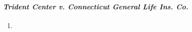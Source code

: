 \paragraph{\emph{Trident Center v. Connecticut General Life Ins. Co.}}

\begin{enumerate}
    \item %
\end{enumerate}



